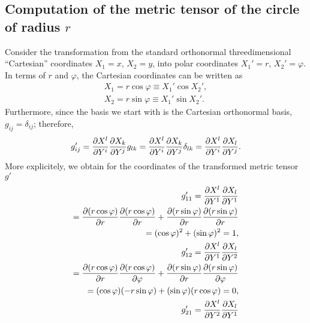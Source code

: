 {
\color{blue}
\bexample

\subsection*{Computation of the metric tensor of the circle of radius $r$}
Consider the transformation from the standard orthonormal
threedimensional ``Cartesian'' coordinates
$X_1=x$,
$X_2=y$,
into polar coordinates
$X_1'=r$,
$X_2'=\varphi$.
In terms of  $r$ and $\varphi$, the Cartesian coordinates can be written as
\begin{equation}
\begin{split}
 X_1=r \cos \varphi \equiv X_1' \cos X_2'  , \\
 X_2=r \sin \varphi \equiv X_1'\sin X_2'  .
\end{split}
\end{equation}
Furthermore,  since the basis we start with is the Cartesian orthonormal basis,
$g_{ij}=\delta_{ij}$; therefore,
\begin{equation}
g'_{ij}= {\partial {X}^l\over \partial { Y }^i}{\partial {X}_k\over \partial { Y }^j} g_{lk}
= {\partial {X}^l\over \partial { Y }^i}{\partial {X}_k\over \partial { Y }^j} \delta_{lk}
= {\partial {X}^l\over \partial { Y }^i}{\partial {X}_l\over \partial { Y }^j}.
\end{equation}
More explicitely, we obtain for the coordinates of the transformed metric tensor $g'$
\begin{equation}
\begin{split}
g'_{11}
= {\partial {X}^l\over \partial { Y }^1}{\partial {X}_l\over \partial { Y }^1} \\
=
{\partial (r \cos \varphi) \over \partial {r}}{\partial (r \cos \varphi) \over \partial {r}}
+
{\partial (r \sin \varphi) \over \partial {r}}{\partial (r \sin \varphi) \over \partial {r}}       \\
=
( \cos \varphi )^2
+
(\sin \varphi )^2 =1,\\
g'_{12}
= {\partial {X}^l\over \partial { Y }^1}{\partial {X}_l\over \partial { Y }^2} \\
=
{\partial (r \cos \varphi) \over \partial {r}}{\partial (r \cos \varphi) \over \partial {\varphi }}
+
{\partial (r \sin \varphi) \over \partial {r}}{\partial (r \sin \varphi) \over \partial {\varphi }}  \\
=
(\cos \varphi ) (- r \sin \varphi )
+
(\sin \varphi )( r \cos \varphi )  =0,\\
g'_{21}
= {\partial {X}^l\over \partial { Y }^2}{\partial {X}_l\over \partial { Y }^1} \\

\end{split}
\end{equation}}
